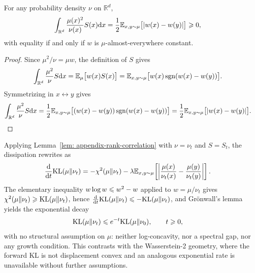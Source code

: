 \documentclass{article}
\begin{document}
\begin{lemma}
\label{lem: appendix-rank-correlation}
For any probability density $\nu$ on $\mathbb R^d$,
\begin{equation*}
    \int_{\mathbb R^d}\frac{\mu(x)^2}{\nu(x)}S(x)\mathrm{d} x = \frac{1}{2} \mathbb E_{x,y\sim\mu}\bigl[|w(x) - w(y)|\bigr] \geqslant 0,
\end{equation*}
with equality if and only if $w$ is $\mu$-almost-everywhere constant.
\end{lemma}

\begin{proof}
Since $\mu^2/\nu = \mu w$, the definition of $S$ gives
\begin{equation*}
    \int_{\mathbb R^d}\frac{\mu^2}{\nu}S\mathrm{d} x = \mathbb E_\mu\bigl[w(x)S(x)\bigr] = \mathbb E_{x,y\sim\mu}\bigl[w(x)\operatorname{sgn}(w(x) - w(y))\bigr].
\end{equation*}
Symmetrizing in $x\leftrightarrow y$ gives
\begin{equation*}
    \int_{\mathbb R^d}\frac{\mu^2}{\nu}S\mathrm{d} x = \frac{1}{2} \mathbb E_{x,y\sim\mu}\bigl[(w(x) - w(y))\operatorname{sgn}(w(x) - w(y))\bigr] = \frac{1}{2} \mathbb E_{x,y\sim\mu}\bigl[ |w(x) - w(y)| \bigr].
\end{equation*}
\end{proof}

Applying Lemma~\ref{lem: appendix-rank-correlation} with $\nu = \nu_t$ and $S = S_t$, the dissipation rewrites as
\begin{equation}
    \frac{\mathrm{d}}{\mathrm{d} t}\mathrm{KL}(\mu\|\nu_t) = -\chi^2(\mu\|\nu_t) - \lambda \mathbb E_{x,y\sim\mu}\!\left[ \left|\frac{\mu(x)}{\nu_t(x)} - \frac{\mu(y)}{\nu_t(y)}\right| \right].
    \label{eq: appendix-combined-rate}
\end{equation}
The elementary inequality $w\log w \leqslant w^2 - w$ applied to $w = \mu/\nu_t$ gives $\chi^2(\mu\|\nu_t) \geqslant \mathrm{KL}(\mu\|\nu_t)$, hence $\frac{\mathrm{d}}{\mathrm{d} t}\mathrm{KL}(\mu\|\nu_t) \leqslant -\mathrm{KL}(\mu\|\nu_t)$, and Gr\"onwall's lemma yields the exponential decay
\begin{equation}
    \mathrm{KL}(\mu\|\nu_t) \leqslant e^{-t} \mathrm{KL}(\mu\|\nu_0),\qquad t \geqslant 0,
    \label{eq: appendix-KL-exponential}
\end{equation}
with no structural assumption on $\mu$: neither log-concavity, nor a spectral gap, nor any growth condition. This contrasts with the Wasserstein-2 geometry, where the forward KL is not displacement convex and an analogous exponential rate is unavailable without further assumptions.
\end{document}
